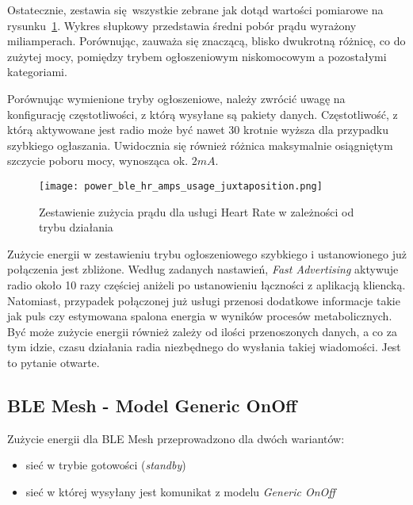 Ostatecznie, zestawia się wszystkie zebrane jak dotąd wartości pomiarowe na rysunku~\ref{rys:power_ble_hr_amps_usage_juxtaposition}.
Wykres słupkowy przedstawia średni pobór prądu wyrażony miliamperach. Porównując, zauważa się znaczącą, blisko dwukrotną
różnicę, co do zużytej mocy, pomiędzy trybem ogłoszeniowym niskomocowym a pozostałymi kategoriami.

Porównując wymienione tryby ogłoszeniowe, należy zwrócić uwagę na konfigurację częstotliwości, z którą wysyłane są
pakiety danych. Częstotliwość, z którą aktywowane jest radio może być nawet 30 krotnie wyższa dla przypadku szybkiego ogłaszania.
Uwidocznia się również różnica maksymalnie osiągniętym szczycie poboru mocy, wynosząca ok. $2mA$.

\begin{figure}[!htb]
	\centering \texttt{[image: power\_ble\_hr\_amps\_usage\_juxtaposition.png]}
	\caption{Zestawienie zużycia prądu dla usługi Heart Rate w zależności od trybu działania}
	\label{rys:power_ble_hr_amps_usage_juxtaposition}
\end{figure}

Zużycie energii w zestawieniu trybu ogłoszeniowego szybkiego i ustanowionego już połączenia jest zbliżone. Według zadanych nastawień,
\textit{Fast Advertising} aktywuje radio około 10 razy częściej aniżeli po ustanowieniu łączności z aplikacją kliencką. Natomiast,
przypadek połączonej już usługi przenosi dodatkowe informacje takie jak puls czy estymowana spalona energia w wyników procesów
metabolicznych. Być może zużycie energii również zależy od ilości przenoszonych danych, a co za tym idzie, czasu działania radia
niezbędnego do wysłania takiej wiadomości. Jest to pytanie otwarte.

\subsection{BLE Mesh - Model Generic OnOff}

Zużycie energii dla BLE Mesh przeprowadzono dla dwóch wariantów:
\begin{itemize}
\item sieć w trybie gotowości (\textit{standby})
\item sieć w której wysyłany jest komunikat z modelu \textit{Generic OnOff}
\end{itemize}

